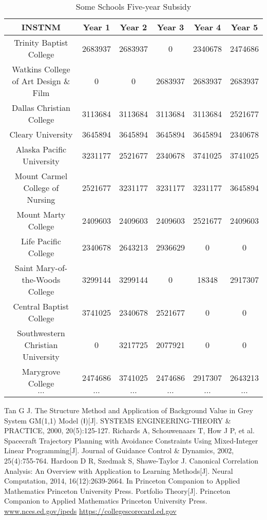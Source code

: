 \documentclass{mcmthesis}
\begin{document}
\begin{table}[h]
\centering
\caption{Some Schools Five-year Subsidy}
\label{tab:Some Schools Five-year Subsidy}
\begin{tabular}{cccccc}
\toprule
INSTNM & Year 1 & Year 2 & Year 3 & Year 4 & Year 5\\
\midrule
Trinity Baptist College & 2683937 & 2683937 & 0 & 2340678 & 2474686\\
Watkins College of Art Design \& Film & 0 & 0 & 2683937 & 2683937 & 2683937\\
Dallas Christian College & 3113684 & 3113684 & 3113684 & 3113684 & 2521677\\
Cleary University & 3645894 & 3645894 & 3645894 & 3645894 & 2340678\\
Alaska Pacific University & 3231177 & 2521677 & 2340678 & 3741025 & 3741025\\
Mount Carmel College of Nursing & 2521677 & 3231177 & 3231177 & 3231177 & 3645894\\
Mount Marty College & 2409603 & 2409603 & 2409603 & 2521677 & 2409603\\
Life Pacific College & 2340678 & 2643213 & 2936629 & 0 & 0\\
Saint Mary-of-the-Woods College & 3299144 & 3299144 & 0 & 18348 & 2917307\\
Central Baptist College & 3741025 & 2340678 & 2521677 & 0 & 0\\
Southwestern Christian University & 0 & 3217725 & 2077921 & 0 & 0\\
Marygrove College & 2474686 & 3741025 & 2474686 & 2917307 & 2643213\\
$\cdots$&$\cdots$&$\cdots$&$\cdots$&$\cdots$&$\cdots$\\
\bottomrule
\end{tabular}
\end{table}





\newpage

\begin{thebibliography}{99}

 Tan G J. The Structure Method and Application of Background Value in Grey System GM(1,1) Model (Ⅰ)[J]. SYSTEMS ENGINEERING-THEORY \& PRACTICE, 2000, 20(5):125-127.
 Richards A, Schouwenaars T, How J P, et al. Spacecraft Trajectory Planning with Avoidance Constraints Using Mixed-Integer Linear Programming[J]. Journal of Guidance Control \& Dynamics, 2002, 25(4):755-764.
 Hardoon D R, Szedmak S, Shawe-Taylor J. Canonical Correlation Analysis: An Overview with Application to Learning Methods[J]. Neural Computation, 2014, 16(12):2639-2664.
 In Princeton Companion to Applied Mathematics Princeton University Press. Portfolio Theory[J]. Princeton Companion to Applied Mathematics Princeton University Press.
 \url{www.nces.ed.gov/ipeds}
 \url{https://collegescorecard.ed.gov}
\end{thebibliography}
\end{document}
